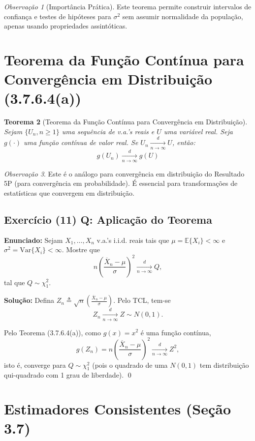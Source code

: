 \documentclass[12pt,a4paper]{article}
\theoremstyle{plain}
\newtheorem{teorema}{Teorema}[section]
\theoremstyle{definition}
\theoremstyle{remark}
\newtheorem{observacao}[teorema]{Observação}
\begin{document}
\begin{observacao}[Importância Prática]
Este teorema permite construir intervalos de confiança e testes de hipóteses para $\sigma^2$ sem assumir normalidade da população, apenas usando propriedades assintóticas.
\end{observacao}

\section{Teorema da Função Contínua para Convergência em Distribuição (3.7.6.4(a))}

\begin{teorema}[Teorema da Função Contínua para Convergência em Distribuição]
Sejam $\{U_n, n \geq 1\}$ uma sequência de v.a.'s reais e $U$ uma variável real. Seja $g(\cdot)$ uma função contínua de valor real. Se $U_n \xrightarrow[n \to \infty]{d} U$, então:
\[
g(U_n) \xrightarrow[n \to \infty]{d} g(U)
\]
\end{teorema}

\begin{observacao}
Este é o análogo para convergência em distribuição do Resultado 5P (para convergência em probabilidade). É essencial para transformações de estatísticas que convergem em distribuição.
\end{observacao}

\subsection*{Exercício (11) Q: Aplicação do Teorema}

\textbf{Enunciado:} Sejam $X_1, \ldots, X_n$ v.a.'s i.i.d. reais tais que $\mu = \mathbb{E}\{X_i\} < \infty$ e $\sigma^2 = \mathrm{Var}\{X_i\} < \infty$. Mostre que
\[
n \left( \frac{\overline{X}_n - \mu}{\sigma} \right)^2 \xrightarrow[n \to \infty]{d} Q,
\]
tal que $Q \sim \chi^2_1$.

\textbf{Solução:} Defina $Z_n \triangleq \sqrt{n} \left( \frac{\overline{X}_n - \mu}{\sigma} \right)$. Pelo TCL, tem-se
\[
Z_n \xrightarrow[n \to \infty]{d} Z \sim N(0,1).
\]

Pelo Teorema (3.7.6.4(a)), como $g(x) = x^2$ é uma função contínua,
\[
g(Z_n) = n \left( \frac{\overline{X}_n - \mu}{\sigma} \right)^2 \xrightarrow[n \to \infty]{d} Z^2,
\]
isto é, converge para $Q \sim \chi^2_1$ (pois o quadrado de uma $N(0,1)$ tem distribuição qui-quadrado com 1 grau de liberdade). \qed

\section{Estimadores Consistentes (Seção 3.7)}
\end{document}
